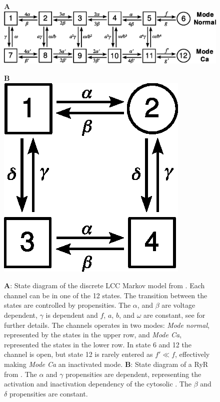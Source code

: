 \begin{figure}[t]
  \centering
  \begin{minipage}{0.79\linewidth}
     \large \textbf{A}\\[0.5em]
    \includegraphics[width=\smallwidth]{chapters/hake/eps/Jafri_1998_LCC_model.eps}
  \end{minipage}
  \begin{minipage}{0.2\linewidth}
     \large \textbf{B}\\[0.5em]
    \includegraphics[width=\smallwidth]{chapters/hake/eps/Stern_1999_RyR_model.eps}
  \end{minipage}
\caption{\textbf{A}: State diagram of the discrete LCC Markov model from \cite{Jafr_1998_1149}. Each channel can be in one of the 12 states.  The transition between the states are controlled by propensities. The $\alpha$, and $\beta$ are voltage dependent, $\gamma$ is \CaC dependent and $f$, $a$, $b$, and $\omega$ are constant, see \cite{Jafr_1998_1149} for further details. The channels operates in two modes: \textit{Mode normal}, represented by the states in the upper row, and \textit{Mode Ca}, represented the states in the lower row. In state 6 and 12 the channel is open, but state 12 is rarely entered as $f'\ll{}f$, effectively making \textit{Mode Ca} an inactivated mode.
\textbf{B}: State diagram of a RyR from \cite{Ster_1999_469}. The $\alpha$ and $\gamma$ propensities are \Ca dependent, representing the activation and inactivation dependency of the cytosolic \CaC. The $\beta$ and $\delta$ propensities are constant.}
\label{fig:markov-models}
\end{figure}

